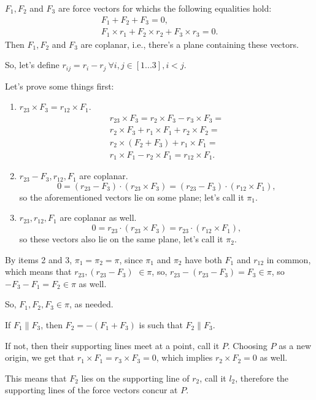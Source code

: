 \documentclass{article}
\author{Jose Ramirez}
\begin{document}
$F_1, F_2$ and $F_3$ are force vectors for whichs the following equalities hold:
\begin{align*}
	F_1 + F_2 + F_3 = 0, \\
	F_1 \times r_1 + F_2 \times r_2 + F_3 \times r_3 = 0.
\end{align*}
Then $F_1, F_2$ and $F_3$ are coplanar, i.e., there's a plane containing these vectors.  


So, let's define $r_{ij} = r_i - r_j\ \forall i, j \in [1 \mathrm{ ... } 3], i < j $.

Let's prove some things first:

\begin{enumerate}
\item $r_{23} \times F_3 = r_{12} \times F_1$.
\begin{align*}
	r_{23} \times F_3 = r_2 \times F_3 - r_3 \times F_3 = \\
	r_2 \times F_3 + r_1 \times F_1 + r_2 \times F_2 = \\
	r_2 \times (F_2 + F_3) + r_1 \times F_1 = \\
	r_1 \times F_1 - r_2 \times F_1 = r_{12}\times F_1.
\end{align*}

\item $r_{23} - F_3, r_{12}, F_1$ are coplanar.
$$0 = (r_{23} - F_3) \cdot (r_{23} \times F_3) = (r_{23} - F_3) \cdot (r_{12} \times F_1),$$
so the aforementioned vectors lie on some plane; let's call it $\pi_1.$

\item $r_{23}, r_{12}, F_1$ are coplanar as well.
$$0 = r_{23} \cdot (r_{23} \times F_3) = r_{23} \cdot (r_{12} \times F_1),$$
so these vectors also lie on the same plane, let's call it $\pi_2.$
\end{enumerate}

By items 2 and 3, $\pi_1 = \pi_2 = \pi$, since $\pi_1$ and $\pi_2$ have both
$F_1$ and $r_{12}$ in common, which means that $r_{23}, (r_{23} - F_3)$ $\in \pi$,
so, $r_{23} - (r_{23} - F_3) = F_3 \in \pi$, so $-F_3 - F_1 = F_2 \in \pi$ as well.

So, $F_1, F_2, F_3 \in \pi$, as needed.

If $F_1 \parallel F_3$, then $ F_2 = -(F_1 + F_3)$ is such that $F_2 \parallel F_3$.

If not, then their supporting lines meet at a point, call it $P$. Choosing $P$ as
a new origin, we get that $r_1 \times F_1 = r_3 \times F_3 = 0$, which implies
$r_2 \times F_2 = 0$ as well.

This means that $F_2$ lies on the supporting line of $r_2$, call it $l_2$, therefore
the supporting lines of the force vectors concur at $P$.
\end{document}
